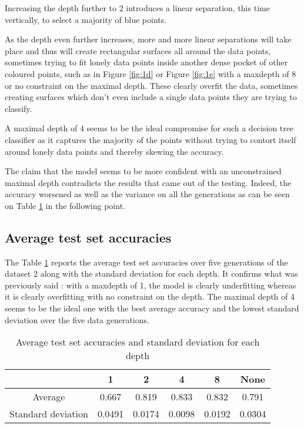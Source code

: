 \documentclass[12pt]{article}
\begin{document}
Increasing the depth further to 2 introduces a linear separation, this time vertically, to select a majority of blue points.

As the depth even further increases, more and more linear separations will take place and thus will create rectangular surfaces all around the data points, sometimes trying to fit lonely data points inside another dense pocket of other coloured points, such as in Figure \ref{fig:1d} or Figure \ref{fig:1e} with a maxdepth of 8 or no constraint on the maximal depth. These clearly overfit the data, sometimes creating surfaces which don't even include a single data points they are trying to classify.

A maximal depth of 4 seems to be the ideal compromise for such a decision tree classifier as it captures the majority of the points without trying to contort itself around lonely data points and thereby skewing the accuracy.

The claim that the model seems to be more confident with an unconstrained maximal depth contradicts the results that came out of the testing. Indeed, the accuracy worsened as well as the variance on all the generations as can be seen on Table \ref{tab:mean_dt} in the following point.

\subsection{Average test set accuracies}

The Table \ref{tab:mean_dt} reports the average test set accuracies over five generations of the dataset 2 along with the standard deviation for each depth. It confirms what was previously said : with a maxdepth of 1, the model is clearly underfitting whereas it is clearly overfitting with no constraint on the depth. The maximal depth of 4 seems to be the ideal one with the best average accuracy and the lowest standard deviation over the five data generations.

\begin{table}[H]
    \centering
    \begin{tabular}{|c|c|c|c|c|c|}
  \hline
 & 1 & 2 & 4 & 8 & None \\
  \hline
  Average & 0.667 & 0.819 & 0.833 & 0.832 & 0.791 \\
  \hline
  Standard deviation & 0.0491 & 0.0174 & 0.0098 & 0.0192 & 0.0304 \\
  \hline
\end{tabular}
    \caption{Average test set accuracies and standard deviation for each depth}
    \label{tab:mean_dt}
\end{table}
\end{document}

